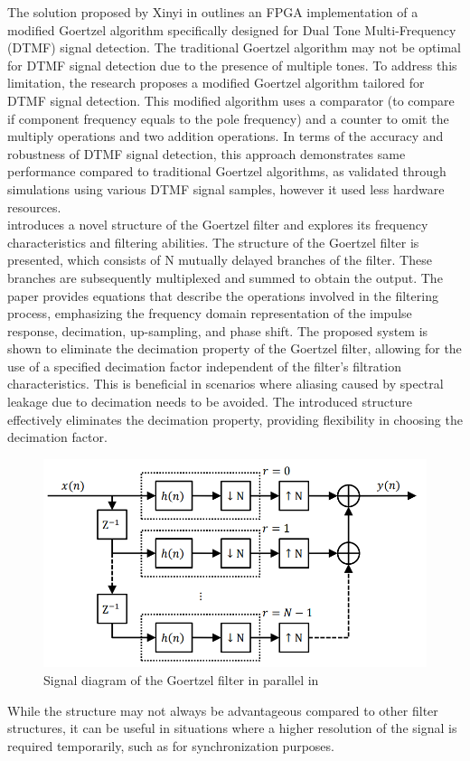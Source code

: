 The solution proposed by Xinyi in \cite{5630500} outlines an FPGA implementation of a modified Goertzel algorithm specifically designed for Dual Tone Multi-Frequency (DTMF) signal detection. The traditional Goertzel algorithm may not be optimal for DTMF signal detection due to the presence of multiple tones. To address this limitation, the research proposes a modified Goertzel algorithm tailored for DTMF signal detection. This modified algorithm uses a comparator (to compare if component frequency equals to the pole frequency) and a counter to omit the multiply operations and two addition operations.  In terms of the accuracy and robustness of DTMF signal detection, this approach demonstrates same performance compared to traditional Goertzel algorithms, as validated through simulations using various DTMF signal samples, however it used less hardware resources.\\
\cite{6828441} introduces a novel structure of the Goertzel filter and explores its frequency characteristics and filtering abilities. 
The structure of the Goertzel filter is presented, which consists of N mutually delayed branches of the filter. These branches are subsequently multiplexed and summed to obtain the output. 
The paper provides equations that describe the operations involved in the filtering process, emphasizing the frequency domain representation of the impulse response, decimation, up-sampling, and phase shift. The proposed system is shown to eliminate the decimation property of the Goertzel filter, allowing for the use of a specified decimation factor independent of the filter's filtration characteristics.  This is beneficial in scenarios where aliasing caused by spectral leakage due to decimation needs to be avoided. The introduced structure effectively eliminates the decimation property, providing flexibility in choosing the decimation factor.  
\begin{figure}
    \centering
    \includegraphics[width=1\linewidth]{Capture1.PNG}
    \caption{Signal diagram of the Goertzel filter in parallel in \cite{6828441}}
    \label{fig:signal_diagram_of_gf}
\end{figure}
While the structure may not always be advantageous compared to other filter structures, it can be useful in situations where a higher resolution of the signal is required temporarily, such as for synchronization purposes. \\

